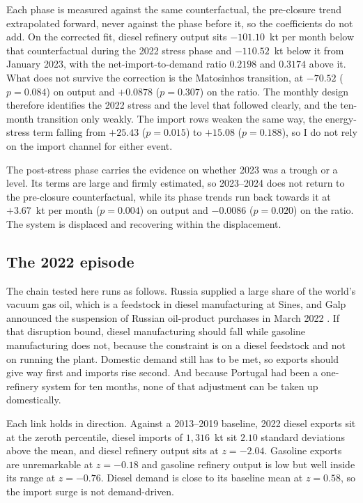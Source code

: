 \documentclass[11pt,a4paper]{article}
\begin{document}
Each phase is measured against the same counterfactual, the pre-closure trend extrapolated
forward, never against the phase before it, so the coefficients do not add. On the corrected
fit, diesel refinery output sits $-101.10$~kt per month below that counterfactual during the
2022 stress phase and $-110.52$~kt below it from January 2023, with the net-import-to-demand
ratio $0.2198$ and $0.3174$ above it. What does not survive the correction is the Matosinhos
transition, at $-70.52$ ($p=0.084$) on output and $+0.0878$ ($p=0.307$) on the ratio. The
monthly design therefore identifies the 2022 stress and the level that followed clearly, and the
ten-month transition only weakly. The import rows weaken the same way, the energy-stress term
falling from $+25.43$ ($p=0.015$) to $+15.08$ ($p=0.188$), so I do not rely on the import channel
for either event.

The post-stress phase carries the evidence on whether 2023 was a trough or a level. Its terms
are large and firmly estimated, so 2023--2024 does not return to the pre-closure counterfactual,
while its phase trends run back towards it at $+3.67$~kt per month ($p=0.004$) on output and
$-0.0086$ ($p=0.020$) on the ratio. The system is displaced and recovering within the
displacement.

\subsection{The 2022 episode}

The chain tested here runs as follows. Russia supplied a large share of the world's vacuum gas
oil, which is a feedstock in diesel manufacturing at Sines, and Galp announced the suspension of
Russian oil-product purchases in March 2022 \citep{galprussian}. If that disruption bound, diesel
manufacturing should fall while gasoline manufacturing does not, because the constraint is on a
diesel feedstock and not on running the plant. Domestic demand still has to be met, so exports
should give way first and imports rise second. And because Portugal had been a one-refinery
system for ten months, none of that adjustment can be taken up domestically.

Each link holds in direction. Against a 2013--2019 baseline, 2022 diesel exports sit at the
zeroth percentile, diesel imports of $1{,}316$~kt sit $2.10$ standard deviations above the mean,
and diesel refinery output sits at $z=-2.04$. Gasoline exports are unremarkable at $z=-0.18$ and
gasoline refinery output is low but well inside its range at $z=-0.76$. Diesel demand is close to
its baseline mean at $z=0.58$, so the import surge is not demand-driven.
\end{document}
